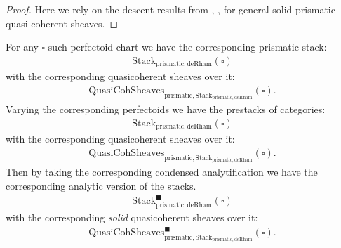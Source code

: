 \documentclass[12pt]{article}
\theoremstyle{definition}
\begin{document}
\begin{proof}
Here we rely on the descent results from \cite{CSA}, \cite{CSB}, \cite{CSC} for general solid prismatic quasi-coherent sheaves.
\end{proof}

\indent For any $\square$ such perfectoid chart we have the corresponding prismatic stack:
\begin{align}
\mathrm{Stack}_{\mathrm{prismatic}, \mathrm{deRham}}(\square)
\end{align}
with the corresponding quasicoherent sheaves over it:
\begin{align}
\mathrm{QuasiCohSheaves}_{\mathrm{prismatic},\mathrm{Stack}_{\mathrm{prismatic}, \mathrm{deRham}}}(\square).
\end{align}
Varying the corresponding perfectoids we have the prestacks of categories:
\begin{align}
\mathrm{Stack}_{\mathrm{prismatic}, \mathrm{deRham}}(\square)
\end{align}
with the corresponding quasicoherent sheaves over it:
\begin{align}
\mathrm{QuasiCohSheaves}_{\mathrm{prismatic},\mathrm{Stack}_{\mathrm{prismatic},\mathrm{deRham}}}(\square).
\end{align}
Then by taking the corresponding condensed analytification we have the corresponding analytic version of the stacks.
\begin{align}
\mathrm{Stack}^\blacksquare_{\mathrm{prismatic},\mathrm{deRham}}(\square)
\end{align}
with the corresponding \textit{solid} quasicoherent sheaves over it:
\begin{align}
\mathrm{QuasiCohSheaves}^\blacksquare_{\mathrm{prismatic},\mathrm{Stack}_{\mathrm{prismatic},\mathrm{deRham}}}(\square).
\end{align}
\end{document}

